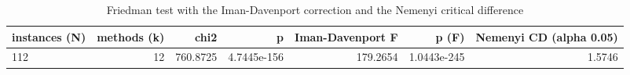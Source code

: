 \begin{table}[htbp]
\centering
\small
\caption{Friedman test with the Iman-Davenport correction and the Nemenyi critical difference}
\label{tab:E4a_equal_budgets_b1_friedman_test}
\begin{tabular}{lrrrrrr}
\toprule
instances (N) & methods (k) & chi2 & p & Iman-Davenport F & p (F) & Nemenyi CD (alpha 0.05) \\
\midrule
112 & 12 & 760.8725 & 4.7445e-156 & 179.2654 & 1.0443e-245 & 1.5746 \\
\bottomrule
\end{tabular}
\end{table}
